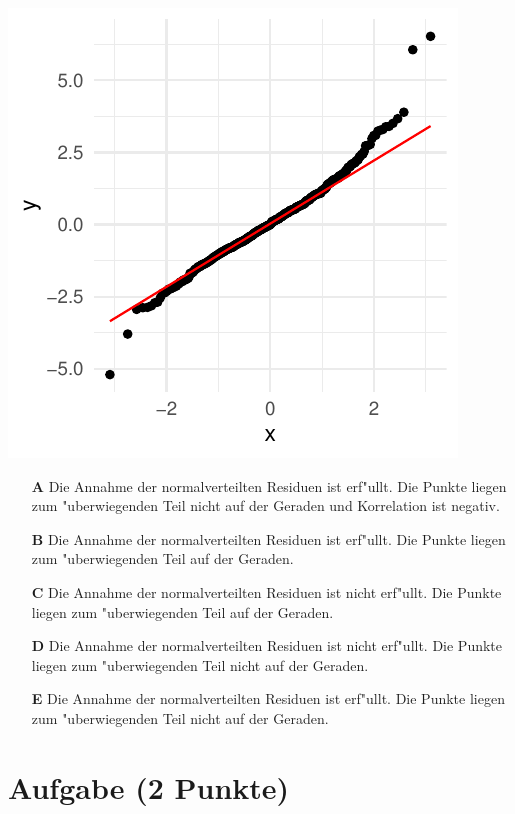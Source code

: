\documentclass[a4paper, 10pt]{scrartcl}\usepackage[]{graphicx}\usepackage[]{xcolor}
\makeatletter
\def\maxwidth{ %
  \ifdim\Gin@nat@width>\linewidth
    \linewidth
  \else
    \Gin@nat@width
  \fi
}
\makeatother
\begin{document}
{\centering \includegraphics[width=\maxwidth]{img/mc-regression-05-a-1} 

}







\begin{enumerate}
\item [\textbf{A} \msquare] Die Annahme der normalverteilten Residuen ist erf{"u}llt. Die Punkte liegen zum {"u}berwiegenden Teil nicht auf der Geraden und Korrelation ist negativ.
\item [\textbf{B} \msquare] Die Annahme der normalverteilten Residuen ist erf{"u}llt. Die Punkte liegen zum {"u}berwiegenden Teil auf der Geraden.
\item [\textbf{C} \msquare] Die Annahme der normalverteilten Residuen ist nicht erf{"u}llt. Die Punkte liegen zum {"u}berwiegenden Teil auf der Geraden.
\item [\textbf{D} \msquare] Die Annahme der normalverteilten Residuen ist nicht erf{"u}llt. Die Punkte liegen zum {"u}berwiegenden Teil nicht auf der Geraden.
\item [\textbf{E} \msquare] Die Annahme der normalverteilten Residuen ist erf{"u}llt. Die Punkte liegen zum {"u}berwiegenden Teil nicht auf der Geraden.
\end{enumerate}

\section{Aufgabe \hfill (2 Punkte)}
\end{document}
